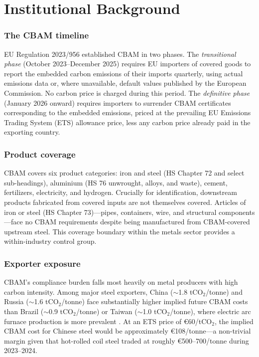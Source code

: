 \documentclass[12pt]{article}
\begin{document}
\section{Institutional Background}

\subsubsection*{The CBAM timeline} EU Regulation 2023/956 established CBAM in two phases. The \textit{transitional phase} (October 2023--December 2025) requires EU importers of covered goods to report the embedded carbon emissions of their imports quarterly, using actual emissions data or, where unavailable, default values published by the European Commission. No carbon price is charged during this period. The \textit{definitive phase} (January 2026 onward) requires importers to surrender CBAM certificates corresponding to the embedded emissions, priced at the prevailing EU Emissions Trading System (ETS) allowance price, less any carbon price already paid in the exporting country.

\subsubsection*{Product coverage} CBAM covers six product categories: iron and steel (HS Chapter 72 and select sub-headings), aluminium (HS 76 unwrought, alloys, and waste), cement, fertilizers, electricity, and hydrogen. Crucially for identification, downstream products fabricated from covered inputs are not themselves covered. Articles of iron or steel (HS Chapter 73)---pipes, containers, wire, and structural components---face no CBAM requirements despite being manufactured from CBAM-covered upstream steel. This coverage boundary within the metals sector provides a within-industry control group.

\subsubsection*{Exporter exposure} CBAM's compliance burden falls most heavily on metal producers with high carbon intensity. Among major steel exporters, China ($\sim$1.8 tCO$_2$/tonne) and Russia ($\sim$1.6 tCO$_2$/tonne) face substantially higher implied future CBAM costs than Brazil ($\sim$0.9 tCO$_2$/tonne) or Taiwan ($\sim$1.0 tCO$_2$/tonne), where electric arc furnace production is more prevalent \citep{worldsteel2022}. At an ETS price of \euro{}60/tCO$_2$, the implied CBAM cost for Chinese steel would be approximately \euro{}108/tonne---a non-trivial margin given that hot-rolled coil steel traded at roughly \euro{}500--700/tonne during 2023--2024.
\end{document}
